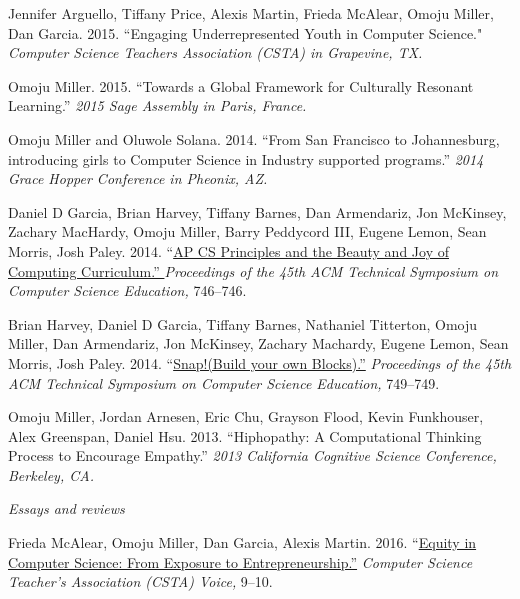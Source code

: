 \documentclass[11pt,article,oneside]{memoir}
\begin{document}

\ind Jennifer Arguello, Tiffany Price, Alexis Martin, Frieda McAlear, Omoju Miller, Dan Garcia. 2015. ``Engaging Underrepresented Youth in Computer Science."  \emph{Computer Science Teachers Association (CSTA) in Grapevine, TX.}

\ind Omoju Miller. 2015. ``Towards a Global Framework for Culturally Resonant Learning.'' \emph{2015 Sage Assembly in Paris, France.}

\ind Omoju Miller and Oluwole Solana. 2014. ``From San Francisco to Johannesburg, introducing girls to Computer Science in Industry supported programs.'' \emph{2014 Grace Hopper Conference in Pheonix, AZ.}

\ind Daniel D Garcia, Brian Harvey, Tiffany Barnes, Dan Armendariz, Jon McKinsey, Zachary MacHardy, Omoju Miller, Barry Peddycord III, Eugene Lemon, Sean Morris, Josh Paley. 2014. ``\href{http://dl.acm.org/citation.cfm?id=2539026}{AP CS Principles and the Beauty and Joy of Computing Curriculum.'' }\emph{Proceedings of the 45th ACM Technical Symposium on Computer Science Education,} 746--746.

\ind Brian Harvey, Daniel D Garcia, Tiffany Barnes, Nathaniel Titterton, Omoju Miller, Dan Armendariz, Jon McKinsey, Zachary Machardy, Eugene Lemon, Sean Morris, Josh Paley. 2014. ``\href{http://dl.acm.org/citation.cfm?id=2539022}{Snap!(Build your own Blocks).''} \emph{Proceedings of the 45th ACM Technical Symposium on Computer Science Education,} 749--749.

\ind Omoju Miller, Jordan Arnesen, Eric Chu, Grayson Flood, Kevin Funkhouser, Alex Greenspan, Daniel Hsu. 2013. ``Hiphopathy: A Computational Thinking Process to Encourage Empathy.'' \emph{2013 California Cognitive Science Conference, Berkeley, CA.}

\bigskip
\noindent\emph{Essays and reviews \vspace{0.05in}}



\ind Frieda McAlear, Omoju Miller, Dan Garcia, Alexis Martin. 2016. ``\href{http://www.csta.acm.org/Communications/sub/CSTAVoice_Files/csta_voice_01_2016.pdf}{Equity in Computer Science: From Exposure to Entrepreneurship.''} \emph{Computer Science Teacher's Association (CSTA) Voice, } 9--10.
\end{document}
